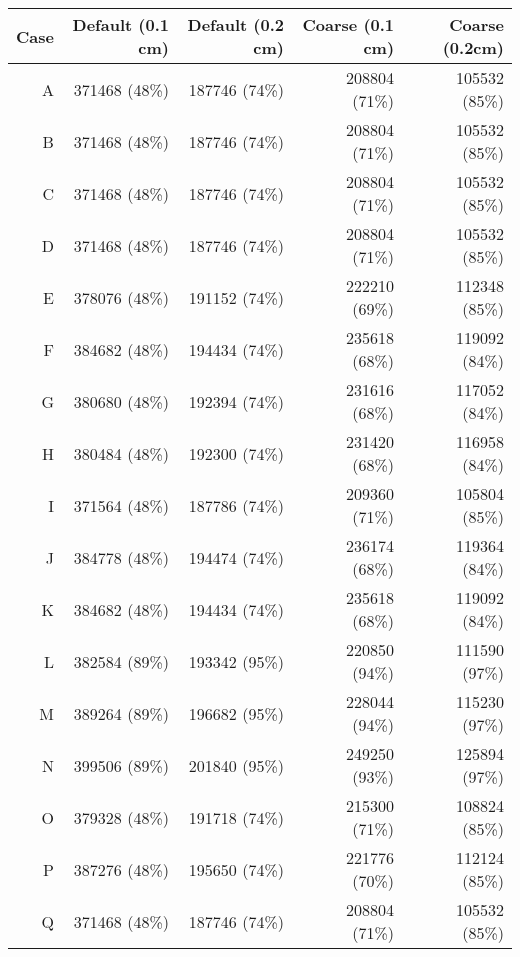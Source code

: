{{{{\begin{table}[htbp]
\begin{tabular}{rrrrr}
             Case & Default (0.1 cm) & Default (0.2 cm) & Coarse (0.1 cm) & Coarse (0.2cm)\\\midrule
              A   & 371468 (48\%) & 187746 (74\%) & 208804 (71\%) & 105532 (85\%)\\
              B   & 371468 (48\%) & 187746 (74\%) & 208804 (71\%) & 105532 (85\%)\\
              C   & 371468 (48\%) & 187746 (74\%) & 208804 (71\%) & 105532 (85\%)\\
              D   & 371468 (48\%) & 187746 (74\%) & 208804 (71\%) & 105532 (85\%)\\
              E   & 378076 (48\%) & 191152 (74\%) & 222210 (69\%) & 112348 (85\%)\\
              F   & 384682 (48\%) & 194434 (74\%) & 235618 (68\%) & 119092 (84\%)\\
              G   & 380680 (48\%) & 192394 (74\%) & 231616 (68\%) & 117052 (84\%)\\
              H   & 380484 (48\%) & 192300 (74\%) & 231420 (68\%) & 116958 (84\%)\\
              I   & 371564 (48\%) & 187786 (74\%) & 209360 (71\%) & 105804 (85\%)\\
              J   & 384778 (48\%) & 194474 (74\%) & 236174 (68\%) & 119364 (84\%)\\
              K   & 384682 (48\%) & 194434 (74\%) & 235618 (68\%) & 119092 (84\%)\\
              L   & 382584 (89\%) & 193342 (95\%) & 220850 (94\%) & 111590 (97\%)\\
              M   & 389264 (89\%) & 196682 (95\%) & 228044 (94\%) & 115230 (97\%)\\
              N   & 399506 (89\%) & 201840 (95\%) & 249250 (93\%) & 125894 (97\%)\\
              O   & 379328 (48\%) & 191718 (74\%) & 215300 (71\%) & 108824 (85\%)\\
              P   & 387276 (48\%) & 195650 (74\%) & 221776 (70\%) & 112124 (85\%)\\
              Q   & 371468 (48\%) & 187746 (74\%) & 208804 (71\%) & 105532 (85\%)\\\bottomrule
          \end{tabular}
        \end{table}
      }
    }

}}
